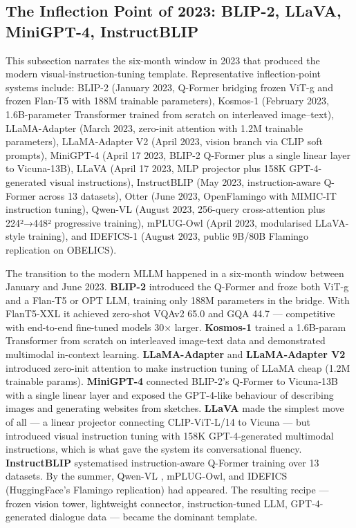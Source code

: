 \documentclass{article}
\begin{document}
\subsection{The Inflection Point of 2023: BLIP-2, LLaVA, MiniGPT-4, InstructBLIP}\label{the-inflection-point-of-2023-blip-2-llava-minigpt-4-instructblip}

This subsection narrates the six-month window in 2023 that produced the modern visual-instruction-tuning template. Representative inflection-point systems include: BLIP-2 (January 2023, Q-Former bridging frozen ViT-g and frozen Flan-T5 with 188M trainable parameters), Kosmos-1 (February 2023, 1.6B-parameter Transformer trained from scratch on interleaved image--text), LLaMA-Adapter (March 2023, zero-init attention with 1.2M trainable parameters), LLaMA-Adapter V2 (April 2023, vision branch via CLIP soft prompts), MiniGPT-4 (April 17 2023, BLIP-2 Q-Former plus a single linear layer to Vicuna-13B), LLaVA (April 17 2023, MLP projector plus 158K GPT-4-generated visual instructions), InstructBLIP (May 2023, instruction-aware Q-Former across 13 datasets), Otter (June 2023, OpenFlamingo with MIMIC-IT instruction tuning), Qwen-VL (August 2023, 256-query cross-attention plus 224²→448² progressive training), mPLUG-Owl (April 2023, modularised LLaVA-style training), and IDEFICS-1 (August 2023, public 9B/80B Flamingo replication on OBELICS).

The transition to the modern MLLM happened in a six-month window between January and June 2023. \textbf{BLIP-2} \citep{li2023blip2bootstrapping} introduced the Q-Former and froze both ViT-g and a Flan-T5 or OPT LLM, training only 188M parameters in the bridge. With FlanT5-XXL it achieved zero-shot VQAv2 65.0 and GQA 44.7 --- competitive with end-to-end fine-tuned models 30× larger. \textbf{Kosmos-1} \citep{huang20232023} trained a 1.6B-param Transformer from scratch on interleaved image-text data and demonstrated multimodal in-context learning. \textbf{LLaMA-Adapter} \citep{zhang2023videollamaaninstru} and \textbf{LLaMA-Adapter V2} \citep{gao20232023} introduced zero-init attention to make instruction tuning of LLaMA cheap (1.2M trainable params). \textbf{MiniGPT-4} \citep{zhu2024minigpt4enhancingv} connected BLIP-2's Q-Former to Vicuna-13B with a single linear layer and exposed the GPT-4-like behaviour of describing images and generating websites from sketches. \textbf{LLaVA} \citep{liu2023visualinstructiont} made the simplest move of all --- a linear projector connecting CLIP-ViT-L/14 to Vicuna --- but introduced visual instruction tuning with 158K GPT-4-generated multimodal instructions, which is what gave the system its conversational fluency. \textbf{InstructBLIP} \citep{dai20232023} systematised instruction-aware Q-Former training over 13 datasets. By the summer, Qwen-VL \citep{bai20232023}, mPLUG-Owl, and IDEFICS (HuggingFace's Flamingo replication) had appeared. The resulting recipe --- frozen vision tower, lightweight connector, instruction-tuned LLM, GPT-4-generated dialogue data --- became the dominant template.
\end{document}
